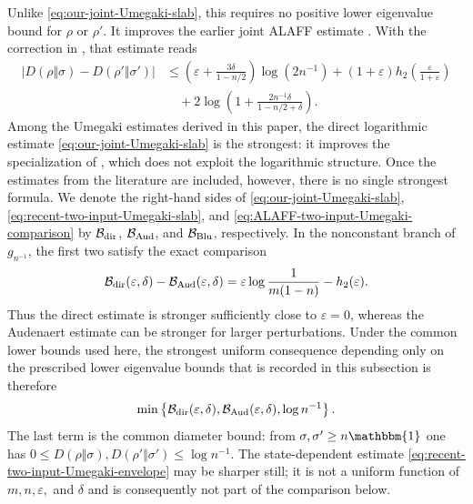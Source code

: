 \documentclass[11pt]{article}
\theoremstyle{remark}
\newcommand{\1}{\mathbbm{1}}
\begin{document}
Unlike \eqref{eq:our-joint-Umegaki-slab}, this requires no positive
lower eigenvalue bound for $\rho$ or $\rho'$.  It improves the earlier
joint ALAFF estimate \cite[Theorem~5.13, Eq.~(22)]
{bluhm2023continuity}.  With the correction in
\cite{bluhm2024corrections}, that estimate reads
\begin{equation}
 \begin{aligned}
 |D(\rho\Vert\sigma)-D(\rho'\Vert\sigma')|
 &\leq
 \left(\varepsilon+\frac{3\delta}{1-n/2}\right)\log(2n^{-1})
 +(1+\varepsilon)h_2\!\left(\frac{\varepsilon}{1+\varepsilon}\right)\\
 &\quad
 +2\log\left(1+\frac{2n^{-1}\delta}{1-n/2+\delta}\right).
 \end{aligned}
 \label{eq:ALAFF-two-input-Umegaki-comparison}
\end{equation}
Among the Umegaki estimates derived in this paper, the direct
logarithmic estimate \eqref{eq:our-joint-Umegaki-slab} is the
strongest: it improves the specialization of
, which does not exploit the
logarithmic structure.  Once the estimates from the literature are
included, however, there is no single strongest formula.  We denote the
right-hand sides of \eqref{eq:our-joint-Umegaki-slab},
\eqref{eq:recent-two-input-Umegaki-slab}, and
\eqref{eq:ALAFF-two-input-Umegaki-comparison} by
$\mathcal B_{\rm dir}$, $\mathcal B_{\rm Aud}$, and
$\mathcal B_{\rm Blu}$, respectively.  In the nonconstant branch of
$g_{n^{-1}}$, the first two satisfy the exact comparison
\begin{equation}
 \mathcal B_{\rm dir}(\varepsilon,\delta)
 -\mathcal B_{\rm Aud}(\varepsilon,\delta)
 =\varepsilon\log\frac{1}{m(1-n)}-h_2(\varepsilon).
 \label{eq:Umegaki-direct-Audenaert-difference}
\end{equation}
Thus the direct estimate is stronger sufficiently close to
$\varepsilon=0$, whereas the Audenaert estimate can be stronger for
larger perturbations.  Under the common lower bounds used here, the
strongest uniform consequence depending only on the prescribed lower
eigenvalue bounds that is recorded in this subsection is
therefore
\begin{equation}
 \min\left\{
   \mathcal B_{\rm dir}(\varepsilon,\delta),
   \mathcal B_{\rm Aud}(\varepsilon,\delta),
   \log n^{-1}
 \right\}.
 \label{eq:best-Umegaki-floor-bound}
\end{equation}
The last term is the common diameter bound: from
$\sigma,\sigma'\geq n\1$ one has
$0\leq D(\rho\Vert\sigma),D(\rho'\Vert\sigma')\leq\log n^{-1}$.
The state-dependent estimate
\eqref{eq:recent-two-input-Umegaki-envelope} may be sharper still;
it is not a uniform function of $m,n,\varepsilon,$ and $\delta$ and
is consequently not part of the comparison below.
\end{document}
